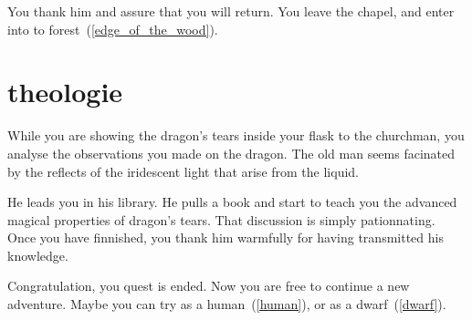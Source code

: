 You thank him and assure that you will return. You leave the chapel, and enter
into to forest~(\ref{edge_of_the_wood}).

\section{theologie}

While you are showing the dragon's tears inside your flask to the churchman, you
analyse the observations you made on the dragon. The old man seems facinated by
the reflects of the iridescent light that arise from the liquid.

He leads you in his library. He pulls a book and start to teach you the advanced
magical properties of dragon's tears. That discussion is simply pationnating.
Once you have finnished, you thank him warmfully for having transmitted his
knowledge.

Congratulation, you quest is ended. Now you are free to continue a new
adventure. Maybe you can try as a human~(\ref{human}), or as a
dwarf~(\ref{dwarf}).
